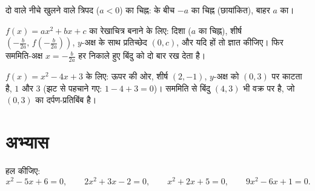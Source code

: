 \begin{omfigure}

{\small दो  वाले नीचे खुलने वाले त्रिपद ($a < 0$) का चिह्न:  के बीच
$-a$ का चिह्न (छायांकित), बाहर $a$ का।}
\end{omfigure}

\begin{method}[परवलय पढ़ना]\label{met:g11:quad:reading}
$f(x) = ax^2+bx+c$ का रेखाचित्र बनाने के लिए: दिशा ($a$ का चिह्न), शीर्ष $\left(-\frac{b}{2a},\, f\!\left(-\frac{b}{2a}\right)\right)$,
$y$-अक्ष के साथ प्रतिच्छेद $(0, c)$, और यदि हों तो  ज्ञात कीजिए। फिर
सममिति-अक्ष $x = -\frac{b}{2a}$ हर निकाले हुए बिंदु को दो बार रख देता है।
\end{method}

\begin{example}
$f(x) = x^2 - 4x + 3$ के लिए: ऊपर की ओर, शीर्ष $(2, -1)$, $y$-अक्ष को $(0,3)$ पर काटता है, 
$1$ और $3$ (झट से पहचाने गए: $1 - 4 + 3 = 0$)। सममिति से बिंदु $(4, 3)$ भी वक्र पर
है, जो $(0, 3)$ का दर्पण-प्रतिबिंब है।
\end{example}

\section{अभ्यास}

\begin{exercise}[$\star$]\label{exo:g11:quad:1}
 हल कीजिए:
\[
x^2 - 5x + 6 = 0, \qquad
2x^2 + 3x - 2 = 0, \qquad
x^2 + 2x + 5 = 0, \qquad
9x^2 - 6x + 1 = 0 .
\]
\end{exercise}

